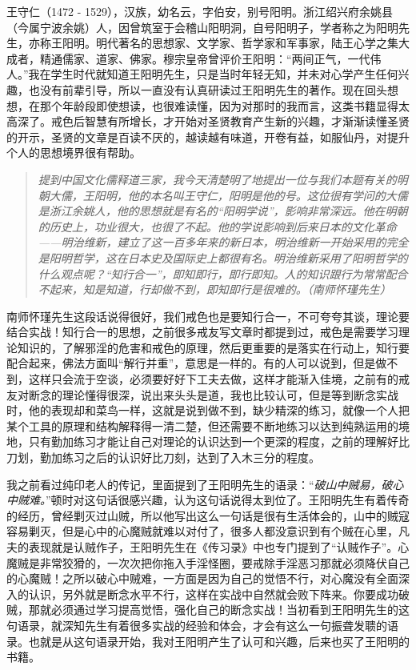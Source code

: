 王守仁（1472 - 1529），汉族，幼名云，字伯安，别号阳明。浙江绍兴府余姚县（今属宁波余姚）人，因曾筑室于会稽山阳明洞，自号阳明子，学者称之为阳明先生，亦称王阳明。明代著名的思想家、文学家、哲学家和军事家，陆王心学之集大成者，精通儒家、道家、佛家。穆宗皇帝曾评价王阳明：“两间正气，一代伟人。”我在学生时代就知道王阳明先生，只是当时年轻无知，并未对心学产生任何兴趣，也没有前辈引导，所以一直没有认真研读过王阳明先生的著作。现在回头想想，在那个年龄段即使想读，也很难读懂，因为对那时的我而言，这类书籍显得太高深了。戒色后智慧有所增长，才开始对圣贤教育产生新的兴趣，才渐渐读懂圣贤的开示，圣贤的文章是百读不厌的，越读越有味道，开卷有益，如服仙丹，对提升个人的思想境界很有帮助。

\begin{quote}\it
    提到中国文化儒释道三家，我今天清楚明了地提出一位与我们本题有关的明朝大儒，王阳明，他的本名叫王守仁，阳明是他的号。这位很有学问的大儒是浙江余姚人，他的思想就是有名的“阳明学说”，影响非常深远。他在明朝的历史上，功业很大，也很了不起。他的学说影响到后来日本的文化革命——明治维新，建立了这一百多年来的新日本，明治维新一开始采用的完全是阳明哲学，这在日本史及国际史上都很有名。明治维新采用了阳明哲学的什么观点呢？“知行合一”，即知即行，即行即知。人的知识跟行为常常配合不起来，知是知道，行却做不到，即知即行是很难的。（南师怀瑾先生）
\end{quote}

南师怀瑾先生这段话说得很好，我们戒色也是要知行合一，不可夸夸其谈，理论要结合实战！知行合一的思想，之前很多戒友写文章时都提到过，戒色是需要学习理论知识的，了解邪淫的危害和戒色的原理，然后更重要的是落实在行动上，知行要配合起来，佛法方面叫“解行并重”，意思是一样的。有的人可以说到，但是做不到，这样只会流于空谈，必须要好好下工夫去做，这样才能渐入佳境，之前有的戒友对断念的理论懂得很深，说出来头头是道，我也比较认可，但是等到断念实战时，他的表现却和菜鸟一样，这就是说到做不到，缺少精深的练习，就像一个人把某个工具的原理和结构解释得一清二楚，但还需要不断地练习以达到纯熟运用的境地，只有勤加练习才能让自己对理论的认识达到一个更深的程度，之前的理解好比刀划，勤加练习之后的认识好比刀刻，达到了入木三分的程度。

我之前看过纯印老人的传记，里面提到了王阳明先生的语录：“\textit{破山中贼易，破心中贼难。}”顿时对这句话很感兴趣，认为这句话说得太到位了。王阳明先生有着传奇的经历，曾经剿灭过山贼，所以他写出这么一句话是很有生活体会的，山中的贼寇容易剿灭，但是心中的心魔贼就难以对付了，很多人都没意识到有个贼在心里，凡夫的表现就是认贼作子，王阳明先生在《传习录》中也专门提到了“认贼作子”。心魔贼是非常狡猾的，一次次把你拖入手淫怪圈，要戒除手淫恶习那就必须降伏自己的心魔贼！之所以破心中贼难，一方面是因为自己的觉悟不行，对心魔没有全面深入的认识，另外就是断念水平不行，这样在实战中自然就会败下阵来。你要成功破贼，那就必须通过学习提高觉悟，强化自己的断念实战！当初看到王阳明先生的这句语录，就深知先生有着很多实战的经验和体会，才会有这么一句振聋发聩的语录。也就是从这句语录开始，我对王阳明产生了认可和兴趣，后来也买了王阳明的书籍。

